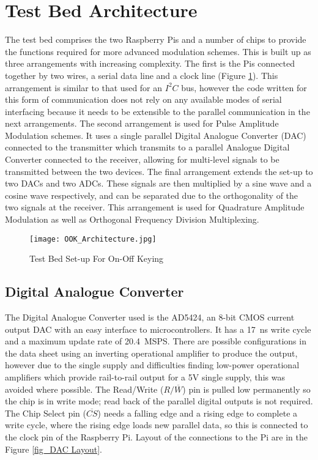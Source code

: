 \documentclass[../main.tex]{subfiles}
\begin{document}
\section{Test Bed Architecture}

The test bed comprises the two Raspberry Pis and a number of chips to provide the functions required for more advanced modulation schemes.
This is built up as three arrangements with increasing complexity.
The first is the Pis connected together by two wires, a serial data line and a clock line (Figure \ref{fig_OOK Architecture}).
This arrangement is similar to that used for an $I^2C$ bus, however the code written for this form of communication does not rely on any available modes of serial interfacing because it needs to be extensible to the parallel communication in the next arrangements.
The second arrangement is used for Pulse Amplitude Modulation schemes.
It uses a single parallel Digital Analogue Converter (DAC) connected to the transmitter which transmits to a parallel Analogue Digital Converter connected to the receiver, allowing for multi-level signals to be transmitted between the two devices.
The final arrangement extends the set-up to two DACs and two ADCs.
These signals are then multiplied by a sine wave and a cosine wave respectively, and can be separated due to the orthogonality of the two signals at the receiver.
This arrangement is used for Quadrature Amplitude Modulation as well as Orthogonal Frequency Division Multiplexing.\\

\begin{figure}[ht]
	\centering
	\texttt{[image: OOK\_Architecture.jpg]}
	\caption{Test Bed Set-up For On-Off Keying}
	\label{fig_OOK Architecture}
\end{figure}

\subsection{Digital Analogue Converter}

The Digital Analogue Converter used is the AD5424, an 8-bit CMOS current output DAC with an easy interface to microcontrollers.
It has a \SI{17}{\nano\second} write cycle and a maximum update rate of \SI{20.4}{MSPS}. %
There are possible configurations in the data sheet using an inverting operational amplifier to produce the output, however due to the single supply and difficulties finding low-power operational amplifiers which provide rail-to-rail output for a 5V single supply, this was avoided where possible.
The Read/Write ($R/\overline{W}$) pin is pulled low permanently so the chip is in write mode; read back of the parallel digital outputs is not required.
The Chip Select pin ($\overline{CS}$) needs a falling edge and a rising edge to complete a write cycle, where the rising edge loads new parallel data, so this is connected to the clock pin of the Raspberry Pi.
Layout of the connections to the Pi are in the Figure \ref{fig_DAC Layout}.\\
\end{document}
